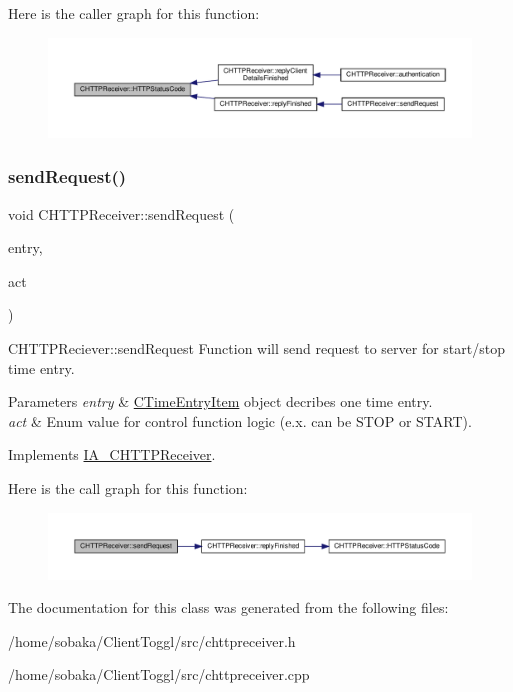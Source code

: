Here is the caller graph for this function\+:
\nopagebreak
\begin{figure}[H]
\begin{center}
\leavevmode
\includegraphics[width=350pt]{classCHTTPReceiver_a0e79cd1e6bf464be0420de66685a3398_icgraph}
\end{center}
\end{figure}
\mbox{\label{classCHTTPReceiver_ac4b7a55951c7340bb2bf483e5b8dbf59}} 
\subsubsection{\texorpdfstring{send\+Request()}{sendRequest()}}
{\footnotesize\ttfamily void C\+H\+T\+T\+P\+Receiver\+::send\+Request (\begin{DoxyParamCaption}\item[{\hyperlink{classIA__CTimeEntryItem}{I\+A\+\_\+\+C\+Time\+Entry\+Item} $\ast$}]{entry,  }\item[{Action}]{act }\end{DoxyParamCaption})\hspace{0.3cm}{\ttfamily [virtual]}}



C\+H\+T\+T\+P\+Reciever\+::send\+Request Function will send request to server for start/stop time entry. 


\begin{DoxyParams}{Parameters}
{\em entry} & \hyperlink{classCTimeEntryItem}{C\+Time\+Entry\+Item} object decribes one time entry. \\
\hline
{\em act} & Enum value for control function logic (e.\+x. can be S\+T\+OP or S\+T\+A\+RT). \\
\hline
\end{DoxyParams}


Implements \hyperlink{classIA__CHTTPReceiver}{I\+A\+\_\+\+C\+H\+T\+T\+P\+Receiver}.

Here is the call graph for this function\+:
\nopagebreak
\begin{figure}[H]
\begin{center}
\leavevmode
\includegraphics[width=350pt]{classCHTTPReceiver_ac4b7a55951c7340bb2bf483e5b8dbf59_cgraph}
\end{center}
\end{figure}


The documentation for this class was generated from the following files\+:\begin{DoxyCompactItemize}
\item 
/home/sobaka/\+Client\+Toggl/src/chttpreceiver.\+h\item 
/home/sobaka/\+Client\+Toggl/src/chttpreceiver.\+cpp\end{DoxyCompactItemize}
